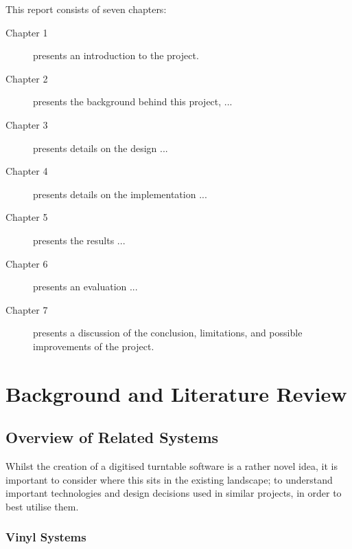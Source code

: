       This report consists of seven chapters:
      \begin{description}
      \item[Chapter 1] presents an introduction to the project.
      \item[Chapter 2] presents the background behind this project, ...
      \item[Chapter 3] presents details on the design ...
      \item[Chapter 4] presents details on the implementation ...
      \item[Chapter 5] presents the results ...
      \item[Chapter 6] presents an evaluation  ...
      \item[Chapter 7] presents a discussion of the conclusion, limitations, and possible improvements of the project.
    \end{description}
    
    
    \section{Background and Literature Review} %
    
      \subsection{Overview of Related Systems}
    
        Whilst the creation of a digitised turntable software is a rather novel idea, it is important to consider where this sits in the existing landscape; to understand important technologies and design decisions used in similar projects, in order to best utilise them.
      
        \subsubsection{Vinyl Systems}
    
